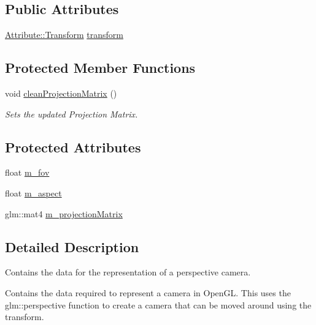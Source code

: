 \subsection*{Public Attributes}
\begin{DoxyCompactItemize}
\item 
\hyperlink{class_cookie_eng_1_1_attribute_1_1_transform}{Attribute\+::\+Transform} \hyperlink{class_cookie_eng_1_1_object_1_1_camera_ae991b0b27c6be58d11f44dbfd3092956}{transform}
\end{DoxyCompactItemize}
\subsection*{Protected Member Functions}
\begin{DoxyCompactItemize}
\item 
void \hyperlink{class_cookie_eng_1_1_object_1_1_camera_ab685b627f1a3bc019ae68185d41ee38b}{clean\+Projection\+Matrix} ()
\begin{DoxyCompactList}\small\item\em Sets the updated Projection Matrix. \end{DoxyCompactList}\end{DoxyCompactItemize}
\subsection*{Protected Attributes}
\begin{DoxyCompactItemize}
\item 
float \hyperlink{class_cookie_eng_1_1_object_1_1_camera_a8ec41f98d646a5c9dd733157ee41f435}{m\+\_\+fov}
\item 
float \hyperlink{class_cookie_eng_1_1_object_1_1_camera_a86c6f04a4f39bfa931493b1f6b9c013c}{m\+\_\+aspect}
\item 
glm\+::mat4 \hyperlink{class_cookie_eng_1_1_object_1_1_camera_a6a5152fd8fbd92c4cbcc73d14511e584}{m\+\_\+projection\+Matrix}
\end{DoxyCompactItemize}


\subsection{Detailed Description}
Contains the data for the representation of a perspective camera. 

Contains the data required to represent a camera in Open\+GL. This uses the glm\+::perspective function to create a camera that can be moved around using the transform. 

